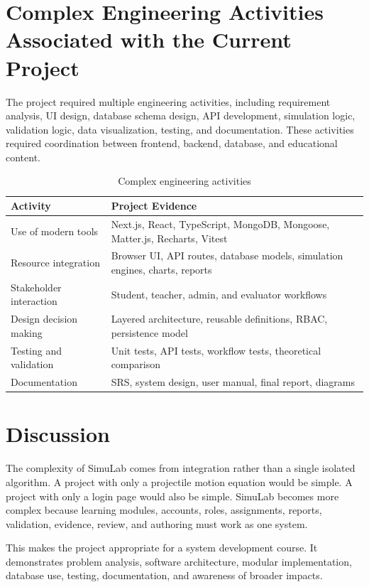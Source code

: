\documentclass[12pt,a4paper]{report}
\begin{document}
\section{Complex Engineering Activities Associated with the Current Project}
The project required multiple engineering activities, including requirement analysis, UI design, database schema design, API development, simulation logic, validation logic, data visualization, testing, and documentation. These activities required coordination between frontend, backend, database, and educational content.

\begin{table}[H]
\centering
\caption{Complex engineering activities}
\begin{tabular}{p{} p{}}
\toprule
\textbf{Activity} & \textbf{Project Evidence} \\
\midrule
Use of modern tools & Next.js, React, TypeScript, MongoDB, Mongoose, Matter.js, Recharts, Vitest \\
Resource integration & Browser UI, API routes, database models, simulation engines, charts, reports \\
Stakeholder interaction & Student, teacher, admin, and evaluator workflows \\
Design decision making & Layered architecture, reusable definitions, RBAC, persistence model \\
Testing and validation & Unit tests, API tests, workflow tests, theoretical comparison \\
Documentation & SRS, system design, user manual, final report, diagrams \\
\bottomrule
\end{tabular}
\end{table}

\section{Discussion}
The complexity of SimuLab comes from integration rather than a single isolated algorithm. A project with only a projectile motion equation would be simple. A project with only a login page would also be simple. SimuLab becomes more complex because learning modules, accounts, roles, assignments, reports, validation, evidence, review, and authoring must work as one system.

This makes the project appropriate for a system development course. It demonstrates problem analysis, software architecture, modular implementation, database use, testing, documentation, and awareness of broader impacts.
\end{document}
